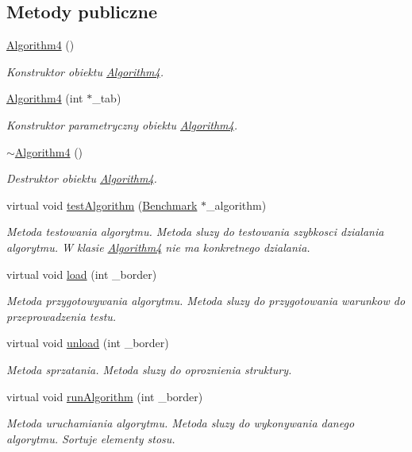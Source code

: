 \subsection*{Metody publiczne}
\begin{DoxyCompactItemize}
\item 
\hyperlink{class_algorithm4_a79f0bdede29ae14437031022b7a32278}{Algorithm4} ()
\begin{DoxyCompactList}\small\item\em Konstruktor obiektu \hyperlink{class_algorithm4}{Algorithm4}. \end{DoxyCompactList}\item 
\hyperlink{class_algorithm4_aac43d02dbf4869be758fc0f9c7b25242}{Algorithm4} (int $\ast$\-\_\-tab)
\begin{DoxyCompactList}\small\item\em Konstruktor parametryczny obiektu \hyperlink{class_algorithm4}{Algorithm4}. \end{DoxyCompactList}\item 
\hyperlink{class_algorithm4_ad73b6bd1ca2b289db737e3e4f5b40abf}{$\sim$\-Algorithm4} ()
\begin{DoxyCompactList}\small\item\em Destruktor obiektu \hyperlink{class_algorithm4}{Algorithm4}. \end{DoxyCompactList}\item 
virtual void \hyperlink{class_algorithm4_a06111d43af13aeb41d7ccf8db4856b79}{test\-Algorithm} (\hyperlink{class_benchmark}{Benchmark} $\ast$\-\_\-algorithm)
\begin{DoxyCompactList}\small\item\em Metoda testowania algorytmu. Metoda sluzy do testowania szybkosci dzialania algorytmu. W klasie \hyperlink{class_algorithm4}{Algorithm4} nie ma konkretnego dzialania. \end{DoxyCompactList}\item 
virtual void \hyperlink{class_algorithm4_aa86adbf6be3052692f885c1be28b2300}{load} (int \-\_\-border)
\begin{DoxyCompactList}\small\item\em Metoda przygotowywania algorytmu. Metoda sluzy do przygotowania warunkow do przeprowadzenia testu. \end{DoxyCompactList}\item 
virtual void \hyperlink{class_algorithm4_a673e2d2373378ab01a7f0378d978f162}{unload} (int \-\_\-border)
\begin{DoxyCompactList}\small\item\em Metoda sprzatania. Metoda sluzy do oproznienia struktury. \end{DoxyCompactList}\item 
virtual void \hyperlink{class_algorithm4_ad1e715e2d6ddec7607f3cafa77443cd2}{run\-Algorithm} (int \-\_\-border)
\begin{DoxyCompactList}\small\item\em Metoda uruchamiania algorytmu. Metoda sluzy do wykonywania danego algorytmu. Sortuje elementy stosu. \end{DoxyCompactList}\end{DoxyCompactItemize}
